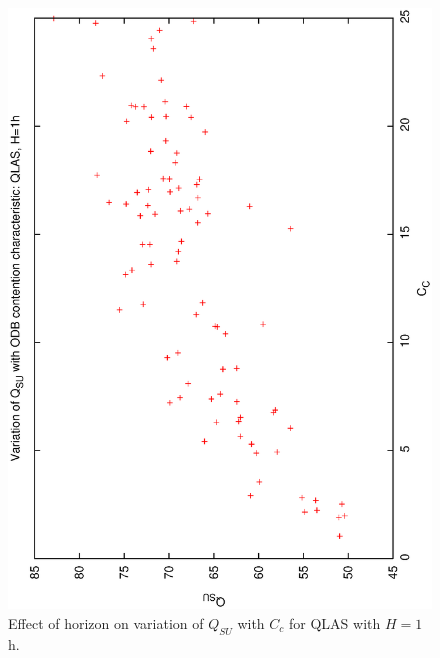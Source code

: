 \begin{figure}[h]
 
\begin{center}
 \includegraphics[scale=0.5, angle=-90]{figures/qsucc_ql1.eps}
 \caption[Effect of horizon on variation of $Q_{SU}$ with $C_c$ for QLAS with $H=1$h.] 
   {Effect of horizon on variation of $Q_{SU}$ with $C_c$ for QLAS with $H=1$h.}
\label{fig:qsucc_ql1}
\end{center}
\end{figure}

